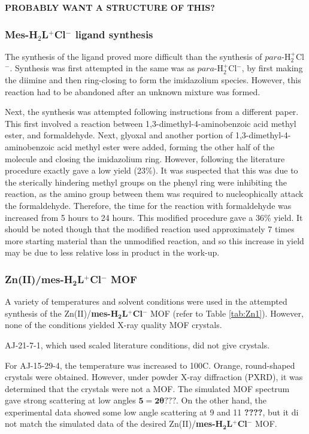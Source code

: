 \documentclass[12pt,a4paper]{article}
\begin{document}
\textbf{PROBABLY WANT A STRUCTURE OF THIS?}

\subsubsection{Mes-H$_2$L$^+$Cl$^-$ ligand synthesis}\label{sec:dis-mesL}
The synthesis of the ligand proved more difficult than the synthesis of $para$-H$_2^+$Cl$^-$. Synthesis was first attempted in the same was as $para$-H$_2^+$Cl$^-$, by first making the diimine and then ring-closing to form the imidazolium species. However, this reaction had to be abandoned after an unknown mixture was formed.

Next, the synthesis was attempted following instructions from a different paper\cite{nickerl2012selective}. This first involved a reaction between 1,3-dimethyl-4-aminobenzoic acid methyl ester, and formaldehyde. Next, glyoxal and another portion of 1,3-dimethyl-4-aminobenzoic acid methyl ester were added, forming the other half of the molecule and closing the imidazolium ring. However, following the literature procedure exactly gave a low yield (23\%). It was suspected that this was due to the sterically hindering methyl groups on the phenyl ring were inhibiting the reaction, as the amino group between them was required to nucleophically attack the formaldehyde. Therefore, the time for the reaction with formaldehyde was increased from 5 hours to 24 hours. This modified procedure gave a 36\% yield. It should be noted though that the modified reaction used approximately 7 times more starting material than the unmodified reaction, and so this increase in yield may be due to less relative loss in product in the work-up.



\subsubsection{Zn(II)/\textbf{mes-H$\bm{_2}$L$\bm{^+}$Cl$\bm{^-}$} MOF}\label{sec:dis-znmof}
A variety of temperatures and solvent conditions were used in the attempted synthesis of the Zn(II)/\textbf{mes-H$\bm{_2}$L$\bm{^+}$Cl$\bm{^-}$} MOF (refer to Table \ref{tab:Zn1}). However, none of the conditions yielded X-ray quality MOF crystals.

AJ-21-7-1, which used scaled literature conditions\cite{nickerl2012selective}, did not give crystals.

For AJ-15-29-4, the temperature was increased to 100\degree C. Orange, round-shaped crystals were obtained. However, under powder X-ray diffraction (PXRD), it was determined that the crystals were not a MOF. The simulated MOF spectrum gave strong scattering at low angles $\bm{5=2\theta ???}$. On the other hand, the experimental data showed some low angle scattering at 9 and 11 \textbf{????}, but it di not match the simulated data of the desired Zn(II)/\textbf{mes-H$\bm{_2}$L$\bm{^+}$Cl$\bm{^-}$} MOF.
\end{document}
